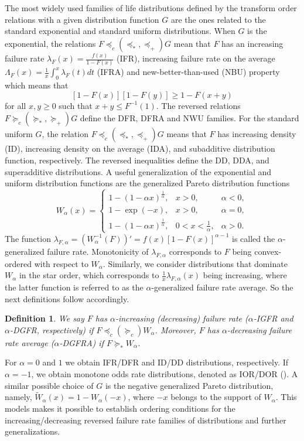 \documentclass [11pt]{article}
\newtheorem{definition}{Definition}
\begin{document}
The most widely used families of life distributions defined by  the transform order relations with a given distribution function $G$ are the ones related to the standard exponential and standard uniform distributions.
When $G$ is the exponential, the relations $F \preceq_c (\preceq_*,\preceq_+) G$ mean that $F$ has an increasing failure rate  $\lambda_F(x) = \frac{f(x)}{1-F(x)}$ (IFR), increasing failure rate on the average $\Lambda_F(x) = \frac 1x \int_0^x \lambda_F(t)dt$ (IFRA) and new-better-than-used (NBU) property which means that
\begin{equation}
\label{1a}
[1-F(x)][1-F(y)] \geq 1-F(x+y)
\end{equation}
for all $x,y \geq 0$ such that $x+y \leq F^{-1}(1)$.
The reversed relations $F \succeq_c (\succeq_*,  \succeq_+) G$ define the DFR, DFRA and NWU families.  For the standard uniform $G$, the relation $F \preceq_c (\preceq_*, \preceq_+) G$ means that $F$ has increasing density (ID), increasing density on the average (IDA), and subadditive distribution function,
respectively. The reversed inequalities define the DD, DDA, and superadditive distributions. A useful generalization of the exponential and uniform distribution functions are the generalized Pareto distribution functions
\begin{equation}
\label{1b}
W_\alpha(x) = \left\{
\begin{array}{lll}
1-(1-\alpha x)^{\frac{1}{\alpha}}, & x >0, & \alpha <0, \\[1.5ex]
1-\exp (-x), & x>0, & \alpha=0, \\[1.5ex]
1-(1-\alpha x) ^{\frac{1}{\alpha}}, & 0 < x < \frac{1}{\alpha},
& \alpha >0.
\end{array}
\right.
\end{equation}
The function $\lambda_{F,\alpha}=(W_\alpha^{-1}(F))'=f(x) [1-F(x)]^{\alpha-1}$ is called the $\alpha$-generalized failure rate. Monotonicity of $\lambda_{F,\alpha}$ corresponds to $F$ being convex-ordered with respect to $W_\alpha$. Similarly, we consider distributions that dominate $W_\alpha$ in the star order, which corresponds to $\frac1{x}{\lambda_{F,\alpha}(x)}$ being increasing, where the latter function is referred to as the $\alpha$-generalized failure rate average. So the next definitions follow accordingly.
\begin{definition}
We say $F$ has $\alpha$-increasing (decreasing) failure rate ($\alpha$-IGFR and $\alpha$-DGFR, respectively) if $F\preceq_c(\succeq_c) W_\alpha$. Moreover, $F$ has $\alpha$-decreasing failure rate average ($\alpha$-DGFRA) if $F\succeq_* W_\alpha$.
\end{definition}
For $ \alpha =0$ and $1$ we obtain IFR/DFR and ID/DD distributions, respectively. If $\alpha=-1$, we obtain monotone odds rate distributions, denoted as IOR/DOR (\cite{oddspaper}). A similar possible choice of $G$ is the negative generalized Pareto distribution, namely, $\widetilde{W}_\alpha(x)=1-W_\alpha(-x)$, where $-x$ belongs to the support of $W_\alpha$. This models makes it possible to establish ordering conditions for the increasing/decreasing reversed failure rate families of distributions and further generalizations. 	
\end{document}

